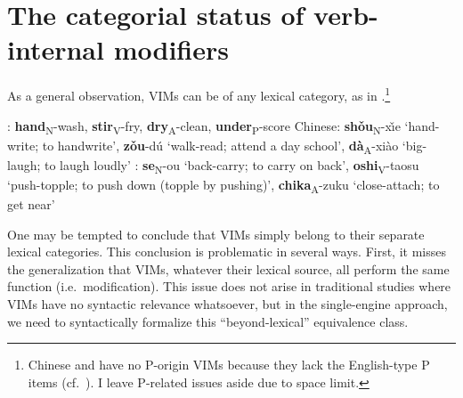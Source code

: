 \documentclass[output=paper]{langsci/langscibook}
\begin{document}
\section{The categorial status of verb-internal modifiers}\label{sec2}

As a general observation, \glspl{VIM} can be of any lexical category, as in .\footnote{Chinese and 
    have no P-origin \glspl{VIM} because they lack the English-type P items
    (cf.\ \citealt{HuangEtal2009,Tsujimura2013,Song2017}). I leave P-related
    issues aside due to space limit.}

\ea\label{ex:lexcat}
\ea {}: \textbf{hand}\textsubscript{N}-wash,
\textbf{stir}\textsubscript{V}-fry, \textbf{dry}\textsubscript{A}-clean,
\textbf{under}\textsubscript{P}-score
\ex Chinese: \textbf{sh\v{o}u}\textsubscript{N}-x\v{\i}e `hand-write; to
handwrite', \textbf{zǒu}-dú \enquote*{walk-read; attend a day school},
\textbf{d\`{a}}\textsubscript{A}-xi\`{a}o `big-laugh; to laugh loudly'
\ex {}: \textbf{se}\textsubscript{N}-ou `back-carry; to carry on back',
\textbf{oshi}\textsubscript{V}-taosu `push-topple; to push down (topple by
pushing)', \textbf{chika}\textsubscript{A}-zuku `close-attach; to get near'
\z
\z

\noindent %

One may be tempted to conclude that \glspl{VIM} simply belong to their separate
lexical categories. This conclusion is problematic in several ways. First, it
misses the generalization that \glspl{VIM}, whatever their lexical source, all perform
the same function (i.e.\ modification). This issue does not arise in traditional
studies where \glspl{VIM} have no syntactic relevance whatsoever, but in the
single-engine approach, we need to syntactically formalize this
``beyond-lexical'' equivalence class.
\end{document}
